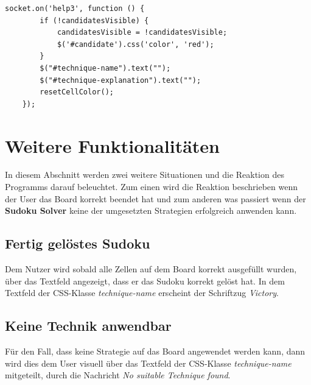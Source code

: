 \begin{lstlisting}[caption={Vierte Hilfestellung}, label={lst:help3}]
	socket.on('help3', function () {
		if (!candidatesVisible) {
			candidatesVisible = !candidatesVisible;
			$('#candidate').css('color', 'red');
		}
		$("#technique-name").text("");
		$("#technique-explanation").text("");
		resetCellColor();
	});

\end{lstlisting}

\section{Weitere Funktionalitäten}
In diesem Abschnitt werden zwei weitere Situationen und die Reaktion des Programms darauf beleuchtet. Zum einen wird die Reaktion beschrieben wenn der User das Board korrekt beendet hat und zum anderen was passiert wenn der \textbf{Sudoku Solver} keine der umgesetzten Strategien erfolgreich anwenden kann.

\subsection{Fertig gelöstes Sudoku}
Dem Nutzer wird sobald alle Zellen auf dem Board korrekt ausgefüllt wurden, über das Textfeld angezeigt, dass er das Sudoku korrekt gelöst hat. In dem Textfeld der CSS-Klasse \textit{technique-name} erscheint der Schriftzug \textit{Victory}.

\subsection{Keine Technik anwendbar}
Für den Fall, dass keine Strategie auf das Board angewendet werden kann, dann wird dies dem User visuell über das Textfeld der CSS-Klasse \textit{technique-name} mitgeteilt, durch die Nachricht \textit{No suitable Technique found}. 